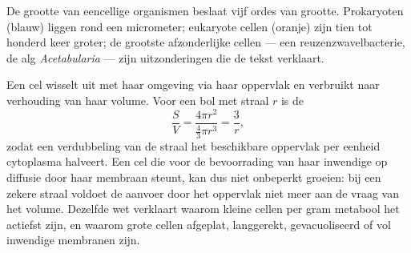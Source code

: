 \begin{omfigure}

{\small De grootte van eencellige organismen beslaat vijf ordes van
grootte. Prokaryoten (blauw) liggen rond een micrometer; eukaryote
cellen (oranje) zijn tien tot honderd keer groter; de grootste
afzonderlijke cellen --- een reuzenzwavelbacterie, de alg
\emph{Acetabularia} --- zijn uitzonderingen die de tekst verklaart.}
\end{omfigure}

\begin{proposition}\label{prop:b2:unicellular-diversity:surface}
Een cel wisselt uit met haar omgeving via haar oppervlak en verbruikt
naar verhouding van haar volume. Voor een bol met straal $r$ is de
\emph{}
\[
\frac{S}{V} = \frac{4\pi r^2}{\tfrac{4}{3}\pi r^3} = \frac{3}{r},
\]
zodat een verdubbeling van de straal het beschikbare oppervlak per
eenheid cytoplasma halveert. Een cel die voor de bevoorrading van haar
inwendige op diffusie door haar membraan steunt, kan dus niet
onbeperkt groeien: bij een zekere straal voldoet de aanvoer door het
oppervlak niet meer aan de vraag van het volume. Dezelfde wet verklaart
waarom kleine cellen per gram metabool het actiefst zijn, en waarom
grote cellen afgeplat, langgerekt, gevacuoliseerd of vol inwendige
membranen zijn.
\end{proposition}

